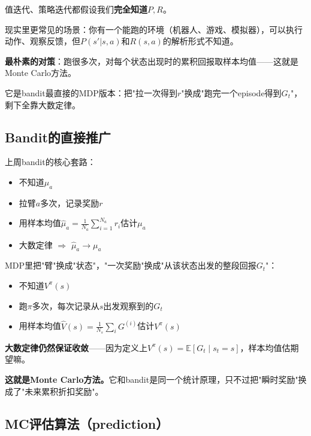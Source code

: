 \documentclass[11pt,a4paper]{article}
\theoremstyle{definition}
\begin{document}
\begin{plainwords}
值迭代、策略迭代都假设我们\textbf{完全知道}$P, R$。

现实里更常见的场景：你有一个能跑的环境（机器人、游戏、模拟器），可以执行动作、观察反馈，但$P(s'|s,a)$和$R(s,a)$的解析形式不知道。

\textbf{最朴素的对策}：跑很多次，对每个状态出现时的累积回报取样本均值——这就是Monte Carlo方法。

它是bandit最直接的MDP版本：把"拉一次得到$r$"换成"跑完一个episode得到$G_t$"，剩下全靠大数定律。
\end{plainwords}

\subsection{Bandit的直接推广}

\begin{intuition}
上周bandit的核心套路：
\begin{itemize}
\item 不知道$\mu_a$
\item 拉臂$a$多次，记录奖励$r$
\item 用样本均值$\hat\mu_a = \frac{1}{N_a}\sum_{i=1}^{N_a} r_i$估计$\mu_a$
\item 大数定律 $\Rightarrow$ $\hat\mu_a \to \mu_a$
\end{itemize}

MDP里把"臂"换成"状态"，"一次奖励"换成"从该状态出发的整段回报$G_t$"：
\begin{itemize}
\item 不知道$V^\pi(s)$
\item 跑$\pi$多次，每次记录从$s$出发观察到的$G_t$
\item 用样本均值$\hat V(s) = \frac{1}{N_s}\sum_{i} G^{(i)}$估计$V^\pi(s)$
\end{itemize}

\textbf{大数定律仍然保证收敛}——因为定义上$V^\pi(s) = \mathbb{E}[G_t \mid s_t = s]$，样本均值估期望嘛。

\textbf{这就是Monte Carlo方法。}它和bandit是同一个统计原理，只不过把"瞬时奖励"换成了"未来累积折扣奖励"。
\end{intuition}

\subsection{MC评估算法（prediction）}
\end{document}
